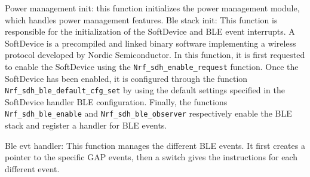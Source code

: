 \documentclass{Configuration_Files/PoliMi3i_thesis}
\begin{document}
Power management init: this function initializes the power management module, which handles power management features. \cite{NordicSemiconductorInfocenterb}
Ble stack init: This function is responsible for the initialization of the SoftDevice and BLE event interrupts. A SoftDevice is a precompiled and linked binary software implementing a wireless protocol developed by Nordic Semiconductor. \cite{NordicSemiconductorInfocenterc} In this function, it is first requested to enable the SoftDevice using the \texttt{Nrf\_sdh\_enable\_request} function. Once the SoftDevice has been enabled, it is configured through the function \texttt{Nrf\_sdh\_ble\_default\_cfg\_set} by using the default settings specified in the SoftDevice handler BLE configuration. Finally, the functions \texttt{Nrf\_sdh\_ble\_enable} and \texttt{Nrf\_sdh\_ble\_observer} respectively enable the BLE stack and register a handler for BLE events.

Ble evt handler: This function manages the different BLE events. It first creates a pointer to the specific GAP events, then a switch gives the instructions for each different event.
\end{document}

